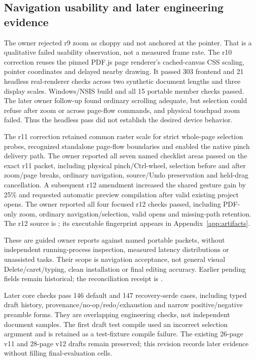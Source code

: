 \subsection{Navigation usability and later engineering evidence}
The owner rejected r9 zoom as choppy and not anchored at the pointer. That is
a qualitative failed usability observation, not a measured frame rate. The
r10 correction reuses the pinned PDF.js page renderer's cached-canvas CSS
scaling, pointer coordinates and delayed nearby drawing. It passed 303 frontend
and 21 headless real-renderer checks across two synthetic document lengths and
three display scales. Windows/NSIS build and all 15 portable member checks passed.
The later owner follow-up found ordinary scrolling adequate, but selection
could refuse after zoom or across page-flow commands, and physical touchpad
zoom failed. Thus the headless pass did not establish the desired device behavior.

The r11 correction retained common raster scale for strict whole-page selection
probes, recognized standalone page-flow boundaries and enabled the native pinch
delivery path. The owner reported all seven named checklist areas passed on
the exact r11 packet, including physical pinch/Ctrl-wheel, selection before and
after zoom/page breaks, ordinary navigation, source/Undo preservation and
held-drag cancellation. A subsequent r12 amendment increased the shared gesture
gain by 25\% and requested automatic preview compilation after valid existing
project opens. The owner reported all four focused r12 checks passed, including
PDF-only zoom, ordinary navigation/selection, valid opens and missing-path
retention. The r12 source is ; its executable fingerprint appears
in Appendix~\ref{app:artifacts}.

These are guided owner reports against named portable packets, without
independent running-process inspection, measured latency distributions or
unassisted tasks. Their scope is navigation acceptance, not general visual
Delete/caret/typing, clean installation or final editing accuracy. Earlier
pending fields remain historical; the reconciliation receipt is
.

Later core checks pass 146 default and 147 recovery-serde cases, including
typed draft history, provenance/no-op/redo/exhaustion and narrow positive/negative
preamble forms. They are overlapping engineering checks, not independent
document samples. The first draft test compile used an incorrect selection
argument and is retained as a test-fixture compile failure. The existing
26-page v11 and 28-page v12 drafts remain preserved; this revision records later
evidence without filling final-evaluation cells.

